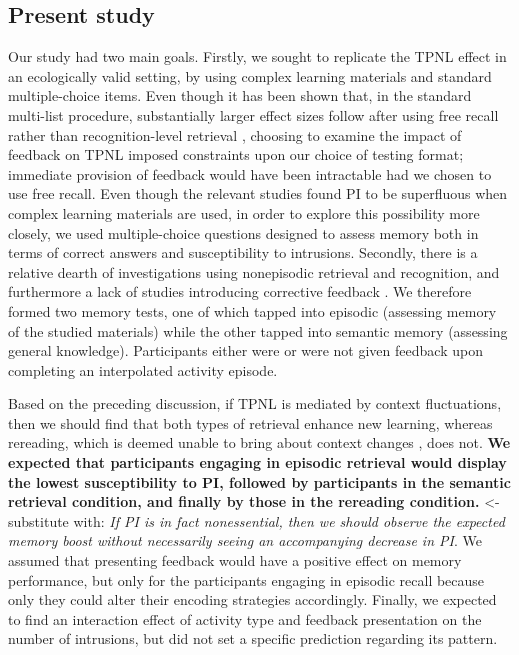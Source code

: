 \documentclass[../main.tex]{subfiles}
\begin{document}
\subsection{Present study\label{present}}

Our study had two main goals. Firstly, we sought to replicate the TPNL 
effect in an ecologically valid setting, by using complex learning materials 
and standard multiple-choice items. Even though it has been shown that, in 
the standard multi-list procedure, substantially larger effect sizes follow 
after using free recall rather than recognition-level retrieval 
 \citep{chanRetrievalPotentiatesNew2018}, choosing to examine the impact of 
feedback on TPNL imposed constraints upon our choice of testing format; 
immediate provision of feedback would have been intractable had we chosen 
to use free recall. Even though the relevant studies found PI to be 
superfluous when complex learning materials are used, in order to explore 
this possibility more closely, we used multiple-choice questions designed to 
assess memory both in terms of correct answers and susceptibility to 
intrusions. Secondly, there is a relative dearth of investigations using 
nonepisodic retrieval and recognition, and furthermore a lack of studies 
introducing corrective feedback \citep{chanRetrievalPotentiatesNew2018}. We 
therefore formed two memory tests, one of which tapped into episodic 
(assessing memory of the studied materials) while the other tapped into 
semantic memory (assessing general knowledge). Participants either were or 
were not given feedback upon completing an interpolated activity episode.

Based on the preceding discussion, if TPNL is mediated by context 
fluctuations, then we should find that both types of retrieval enhance new 
learning, whereas rereading, which is deemed unable to bring about context 
changes \citep{chanRetrievalPotentiatesNew2018}, does not. \textbf{We 
expected that participants engaging in episodic retrieval would display the 
lowest susceptibility to PI, followed by participants in the semantic 
retrieval condition, and finally by those in the rereading condition.} <- 
substitute with: \textit{If PI is in fact nonessential, then we should 
observe the expected memory boost without necessarily seeing an accompanying 
decrease in PI}. We assumed that presenting feedback would have a positive 
effect on memory performance, but only for the participants engaging in 
episodic recall because only they could alter their encoding strategies 
accordingly. Finally, we expected to find an interaction effect of activity 
type and feedback presentation on the number of intrusions, but did not set 
a specific prediction regarding its pattern.
 
{
	\biblio
}
\end{document}
